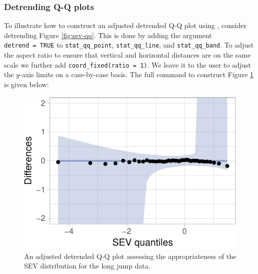 \FloatBarrier

\subsubsection{Detrending Q-Q plots}\label{detrending-q-q-plots}

\label{sec:detrending}

To illustrate how to construct an adjusted detrended Q-Q plot using
, consider detrending Figure \ref{fig:sev-qq}. This is done
by adding the argument \texttt{detrend\ =\ TRUE} to
\texttt{stat\_qq\_point}, \texttt{stat\_qq\_line}, and
\texttt{stat\_qq\_band}. To adjust the aspect ratio to ensure that
vertical and horizontal distances are on the same scale we further add
\texttt{coord\_fixed(ratio\ =\ 1)}. We leave it to the user to adjust
the \(y\)-axis limits on a case-by-case basis. The full command to
construct Figure \ref{fig:detrend-sev} is given below:

\begin{Schunk}
\begin{figure}

{\centering \includegraphics[width=0.45\linewidth]{loy-figures/detrend-sev-1} 

}

\caption[An adjusted detrended Q-Q plot assessing the appropriateness of the SEV distribution for the long jump data]{An adjusted detrended Q-Q plot assessing the appropriateness of the SEV distribution for the long jump data.}\label{fig:detrend-sev}
\end{figure}
\end{Schunk}

